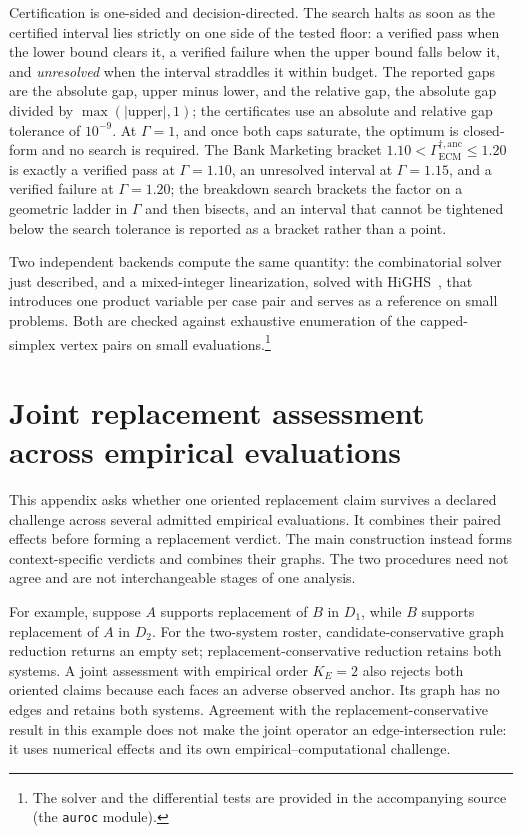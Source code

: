 \documentclass[11pt]{article}
\theoremstyle{remark}
\begin{document}
Certification is one-sided and decision-directed. The search halts as soon as
the certified interval lies strictly on one side of the tested floor: a verified
pass when the lower bound clears it, a verified failure when the upper bound
falls below it, and \emph{unresolved} when the interval straddles it within
budget. The reported gaps are the absolute gap, upper minus lower, and the
relative gap, the absolute gap divided by $\max(|\text{upper}|,1)$; the
certificates use an absolute and relative gap tolerance of $10^{-9}$. At
$\Gamma=1$, and once both caps saturate, the optimum is closed-form and no
search is required. The Bank Marketing bracket
$1.10<\Gamma_{\mathrm{ECM}}^{\dagger,\mathrm{anc}}\leq1.20$ is exactly a verified
pass at $\Gamma=1.10$, an unresolved interval at $\Gamma=1.15$, and a verified
failure at $\Gamma=1.20$; the breakdown search brackets the factor on a
geometric ladder in $\Gamma$ and then bisects, and an interval that cannot be
tightened below the search tolerance is reported as a bracket rather than a
point.

Two independent backends compute the same quantity: the combinatorial solver
just described, and a mixed-integer linearization, solved with HiGHS~\cite{huangfu2018highs},
that introduces one product variable per case pair and serves as a reference on
small problems. Both are checked against exhaustive enumeration of
the capped-simplex vertex pairs on small evaluations.\footnote{The solver and
the differential tests are provided in the accompanying source (the
\texttt{auroc} module).}

\section{Joint replacement assessment across empirical evaluations}
\label{app:joint-empirical}

This appendix asks whether one oriented replacement claim survives a declared
challenge across several admitted empirical evaluations. It combines their
paired effects before forming a replacement verdict. The main construction
instead forms context-specific verdicts and combines their graphs. The two
procedures need not agree and are not interchangeable stages of one analysis.

For example, suppose $A$ supports replacement of $B$ in $D_1$, while $B$
supports replacement of $A$ in $D_2$. For the two-system roster,
candidate-conservative graph reduction returns an empty set;
replacement-conservative reduction retains both systems. A joint assessment
with empirical order $K_E=2$ also rejects both oriented claims because each
faces an adverse observed anchor. Its graph has no edges and retains both
systems. Agreement with the replacement-conservative result in this example
does not make the joint operator an edge-intersection rule: it uses numerical
effects and its own empirical--computational challenge.
\end{document}
